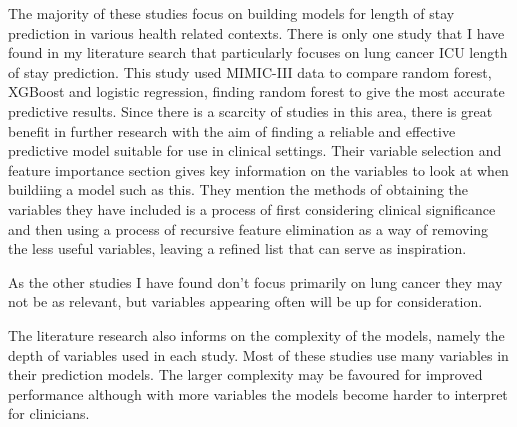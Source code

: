 \documentclass[11pt]{article}
\begin{document}
The majority of these studies focus on building models for length of stay prediction in various health related contexts. There is only one study that I have found in my literature search that particularly focuses on lung cancer ICU length of stay prediction. This study used MIMIC-III data to compare random forest, XGBoost and logistic regression, finding random forest to give the most accurate predictive results. Since there is a scarcity of studies in this area, there is great benefit in further research with the aim of finding a reliable and effective predictive model suitable for use in clinical settings. Their variable selection and feature importance section gives key information on the variables to look at when buildiing a model such as this. They mention the methods of obtaining the variables they have included is a process of first considering clinical significance and then using a process of recursive feature elimination as a way of removing the less useful variables, leaving a refined list that can serve as inspiration.

As the other studies I have found don't focus primarily on lung cancer they may not be as relevant, but variables appearing often will be up for consideration.    %


The literature research also informs on the complexity of the models, namely the depth of variables used in each study. Most of these studies use many variables in their prediction models. The larger complexity may be favoured for improved performance although with more variables the models become harder to interpret for clinicians.  %


\end{document}
